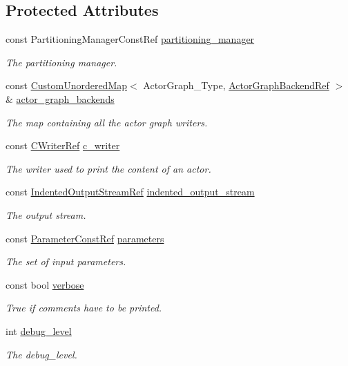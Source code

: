 \subsection*{Protected Attributes}
\begin{DoxyCompactItemize}
\item 
const Partitioning\+Manager\+Const\+Ref \hyperlink{classActorGraphBackend_ace4589f3c341c6da0f34311d05a56d9d}{partitioning\+\_\+manager}
\begin{DoxyCompactList}\small\item\em The partitioning manager. \end{DoxyCompactList}\item 
const \hyperlink{custom__map_8hpp_ad1ed68f2ff093683ab1a33522b144adc}{Custom\+Unordered\+Map}$<$ Actor\+Graph\+\_\+\+Type, \hyperlink{actor__graph__backend_8hpp_ae30db41c92b2664ac3ed9f9633c49969}{Actor\+Graph\+Backend\+Ref} $>$ \& \hyperlink{classActorGraphBackend_a8b2c70ac1d05962bd8ef3938ff0b5245}{actor\+\_\+graph\+\_\+backends}
\begin{DoxyCompactList}\small\item\em The map containing all the actor graph writers. \end{DoxyCompactList}\item 
const \hyperlink{c__writer_8hpp_a4e9c4dfe17e35f981e27b6dd97f9632c}{C\+Writer\+Ref} \hyperlink{classActorGraphBackend_a2cb0997768049a912eda90135e53b6d1}{c\+\_\+writer}
\begin{DoxyCompactList}\small\item\em The writer used to print the content of an actor. \end{DoxyCompactList}\item 
const \hyperlink{indented__output__stream_8hpp_ab32278e11151ef292759c88e99b77feb}{Indented\+Output\+Stream\+Ref} \hyperlink{classActorGraphBackend_a7cb3b39da131fa83f3968c607e6c759b}{indented\+\_\+output\+\_\+stream}
\begin{DoxyCompactList}\small\item\em The output stream. \end{DoxyCompactList}\item 
const \hyperlink{Parameter_8hpp_a37841774a6fcb479b597fdf8955eb4ea}{Parameter\+Const\+Ref} \hyperlink{classActorGraphBackend_a232a0dcb6c538474c938a8dffbcf301e}{parameters}
\begin{DoxyCompactList}\small\item\em The set of input parameters. \end{DoxyCompactList}\item 
const bool \hyperlink{classActorGraphBackend_afd77c9f5660886e118b6af2b4be03328}{verbose}
\begin{DoxyCompactList}\small\item\em True if comments have to be printed. \end{DoxyCompactList}\item 
int \hyperlink{classActorGraphBackend_a31ed80ce88629afbd917ab01d07c3fdf}{debug\+\_\+level}
\begin{DoxyCompactList}\small\item\em The debug\+\_\+level. \end{DoxyCompactList}\end{DoxyCompactItemize}


